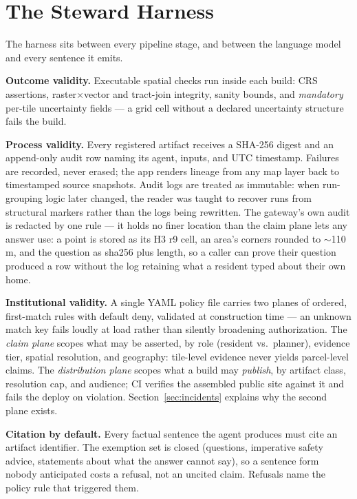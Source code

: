 \documentclass[sigconf,screen]{acmart}
\begin{document}
\section{The Steward Harness}

The harness sits between every pipeline stage, and between the language
model and every sentence it emits.

\textbf{Outcome validity.} Executable spatial checks run inside each
build: CRS assertions, raster$\times$vector and tract-join integrity,
sanity bounds, and \emph{mandatory} per-tile uncertainty fields --- a
grid cell without a declared uncertainty structure fails the build.

\textbf{Process validity.} Every registered artifact receives a SHA-256
digest and an append-only audit row naming its agent, inputs, and UTC
timestamp. Failures are recorded, never erased; the app renders lineage
from any map layer back to timestamped source snapshots. Audit logs are
treated as immutable: when run-grouping logic later changed, the reader
was taught to recover runs from structural markers rather than the logs
being rewritten. The gateway's own audit is redacted by one rule --- it
holds no finer location than the claim plane lets any answer use: a
point is stored as its H3 r9 cell, an area's corners rounded to
$\sim$110\,m, and the question as sha256 plus length, so a caller can
prove their question produced a row without the log retaining what a
resident typed about their own home.

\textbf{Institutional validity.} A single YAML policy file carries two
planes of ordered, first-match rules with default deny, validated at
construction time --- an unknown match key fails loudly at load rather
than silently broadening authorization. The \emph{claim plane} scopes
what may be asserted, by role (resident vs.\ planner), evidence tier,
spatial resolution, and geography: tile-level evidence never yields
parcel-level claims. The \emph{distribution plane} scopes what a build
may \emph{publish}, by artifact class, resolution cap, and audience; CI
verifies the assembled public site against it and fails the deploy on
violation. Section~\ref{sec:incidents} explains why the second plane
exists.

\textbf{Citation by default.} Every factual sentence the agent produces
must cite an artifact identifier. The exemption set is closed
(questions, imperative safety advice, statements about what the answer
cannot say), so a sentence form nobody anticipated costs a refusal, not
an uncited claim. Refusals name the policy rule that triggered them.
\end{document}
